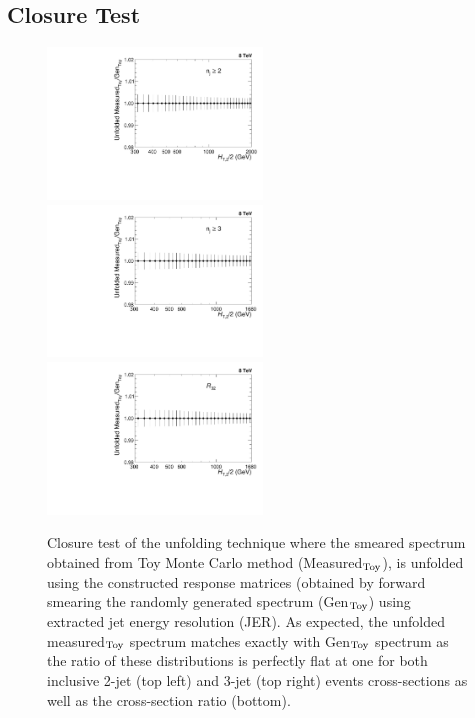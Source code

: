 \subsection{Closure Test}
\begin{figure}[!ht]
 \begin{center}
 \hspace*{-3mm}\includegraphics[width=0.51\textwidth]{Plots_HT_2_150/Ratio_Unfolding_NLO_2_funcI.pdf}%
 ~~\includegraphics[width=0.51\textwidth]{Plots_HT_2_150/Ratio_Unfolding_NLO_3_funcI.pdf}\\
 \includegraphics[width=0.51\textwidth]{Plots_HT_2_150/Ratio_Unfolding_NLO_Ratio_32_funcI.pdf}
 \caption[Closure test of the unfolding technique .]{Closure test of the unfolding technique where the smeared spectrum obtained from Toy Monte Carlo method (Measured$_{\rm Toy}$), is unfolded using the constructed response matrices (obtained by forward smearing the randomly generated spectrum (Gen$_{\rm Toy}$) using extracted jet energy resolution (JER). As expected, the unfolded measured$_{\rm Toy}$ spectrum matches exactly with Gen$_{\rm Toy}$ spectrum as the ratio of these distributions is perfectly flat at one for both inclusive 2-jet (top left) and 3-jet (top right) events cross-sections as well as the cross-section ratio \ratio (bottom).}
 \label{fig:unfolded_smeared}
 \end{center}
\end{figure}

